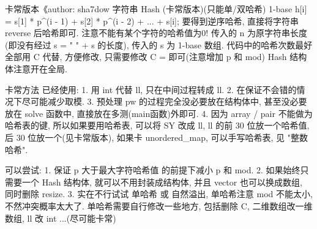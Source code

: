卡常版本《author: sha7dow
字符串 Hash (卡常版本)(只能单/双哈希)
1-base
h[i] = s[1] * p^(i - 1) + s[2] * p^(i - 2) + ... + s[i];
要得到逆序哈希, 直接将字符串 reverse 后哈希即可.
注意不能有某个字符的哈希值为0!
传入的 n 为原字符串长度(即没有经过 s = " " + s 的长度), 传入的 s 为 1-base 数组.
代码中的哈希次数最好全部用 C 代替, 方便修改, 只需要修改 C = 即可(注意增加 p 和 mod)
Hash 结构体注意开在全局.


卡常方法
已经使用:
1. 用 int 代替 ll, 只在中间过程转成 ll.
2. 在保证不会错的情况下尽可能减少取模.
3. 预处理 pw 的过程完全没必要放在结构体中, 甚至没必要放在 solve 函数中, 直接放在多测(main函数)外即可.
4. 因为 array / pair 不能做为哈希表的键, 所以如果要用哈希表, 可以将 SY 改成 ll, ll 的前 30 位放一个哈希值, 
   后 30 位放一个(见卡常版本), 如果卡 unordered_map, 可以手写哈希表, 见 "整数哈希".

可以尝试:
1. 保证 p 大于最大字符哈希值 的前提下减小 p 和 mod.
2. 如果始终只需要一个 Hash 结构体, 就可以不用封装成结构体, 并且 vector 也可以换成数组, 同时删除 resize.
3. 实在不行试试 单哈希 或 自然溢出, 单哈希注意 mod 不能太小, 不然冲突概率太大了.
   单哈希需要自行修改一些地方, 包括删除 C, 二维数组改一维数组, ll 改 int ...(尽可能卡常) 